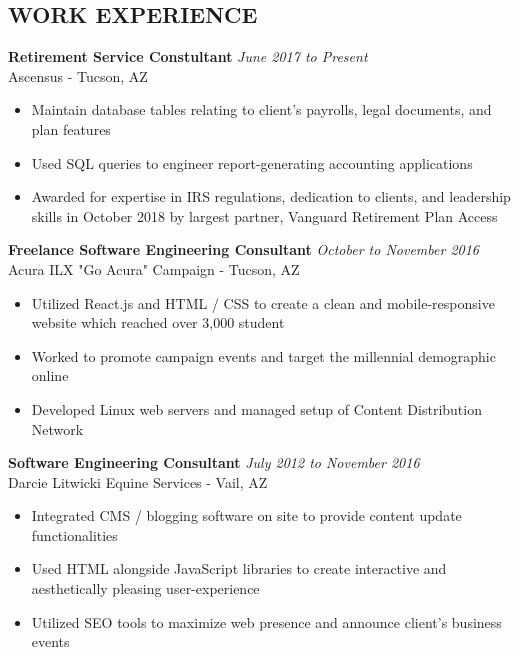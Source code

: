 \documentclass[11pt]{res} %
\begin{document}
 
 
\address{Tucson, AZ $|$ xmclallen@gmail.com $|$ (910) 916-0948}        
         
                        
\begin{resume}                         

\section{WORK EXPERIENCE}
\vspace{4pt}
  {\bf Retirement Service Constultant} \hfill  {\sl June 2017 to Present}\\
  Ascensus - Tucson, AZ
  
   \begin{itemize} %
   \item Maintain database tables relating to client’s payrolls, legal documents, and plan features
   \item Used SQL queries to engineer report-generating accounting applications
   \item Awarded for expertise in IRS regulations, dedication to clients, and leadership skills in October 2018 by largest partner, Vanguard Retirement Plan Access
   \end{itemize}


  {\bf Freelance Software Engineering Consultant} \hfill  {\sl October to November 2016}\\
  Acura ILX "Go Acura" Campaign - Tucson, AZ
  
   \begin{itemize} %
   \item Utilized React.js and HTML / CSS to create a clean and mobile-responsive website which reached over 3,000 student
   \item Worked to promote campaign events and target the millennial demographic online
   \item Developed Linux web servers and managed setup of Content Distribution Network
   \end{itemize}
   
   
  {\bf Software Engineering Consultant} \hfill  {\sl July 2012 to November 2016}\\
  Darcie Litwicki Equine Services - Vail, AZ
  
   \begin{itemize} %
   \item Integrated CMS / blogging software on site to provide content update functionalities
   \item Used HTML alongside JavaScript libraries to create interactive and aesthetically pleasing user-experience
   \item Utilized SEO tools to maximize web presence and announce client’s business events
   \end{itemize}
   

\end{resume}
\end{document}
